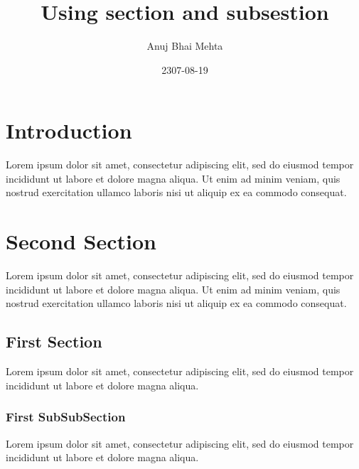 \documentclass{article}
\title{Using section and subsestion}
\date{2307-08-19}
\author{Anuj Bhai Mehta}
\begin{document}
 
\maketitle
 
\section{Introduction}
  
Lorem ipsum dolor sit amet, consectetur adipiscing elit, sed do eiusmod tempor incididunt ut labore et dolore magna aliqua. Ut enim ad minim veniam, quis nostrud exercitation ullamco laboris nisi ut aliquip ex ea commodo consequat.
 
\section{Second Section}
 
Lorem ipsum dolor sit amet, consectetur adipiscing elit, sed do eiusmod tempor incididunt ut labore et dolore magna aliqua. Ut enim ad minim veniam, quis nostrud exercitation ullamco laboris nisi ut aliquip ex ea commodo consequat.


\subsection{First Section}

Lorem ipsum dolor sit amet, consectetur adipiscing elit, sed do eiusmod tempor incididunt ut labore et dolore magna aliqua.

\subsubsection{First SubSubSection}

Lorem ipsum dolor sit amet, consectetur adipiscing elit, sed do eiusmod tempor incididunt ut labore et dolore magna aliqua. 
\end{document}
